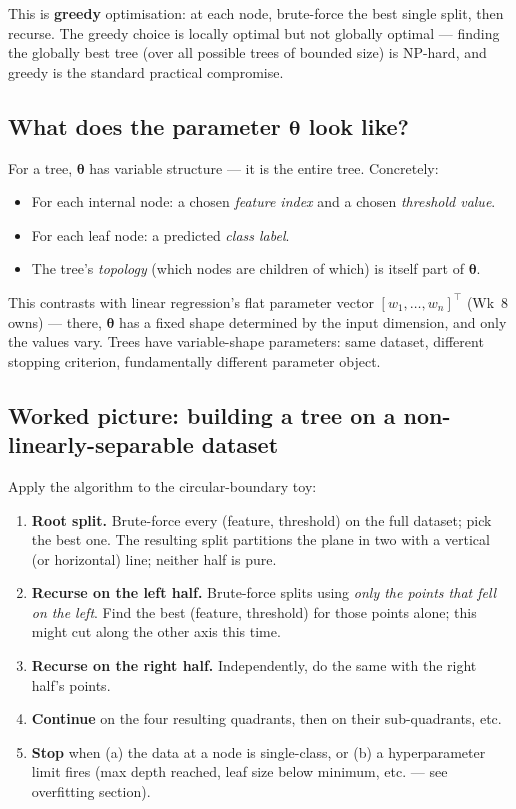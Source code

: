 \documentclass[11pt, a4paper]{article}
\begin{document}
This is \textbf{greedy} optimisation: at each node, brute-force the best single split, then recurse. The greedy choice is locally optimal but not globally optimal — finding the globally best tree (over all possible trees of bounded size) is NP-hard, and greedy is the standard practical compromise.

\subsection{\texorpdfstring{What does the parameter $\boldsymbol\theta$ look like?}{What does the parameter theta look like?}}

For a tree, $\boldsymbol\theta$ has variable structure — it is the entire tree. Concretely:

\begin{itemize}
  \item For each internal node: a chosen \emph{feature index} and a chosen \emph{threshold value}.
  \item For each leaf node: a predicted \emph{class label}.
  \item The tree's \emph{topology} (which nodes are children of which) is itself part of $\boldsymbol\theta$.
\end{itemize}

This contrasts with linear regression's flat parameter vector $[w_1, \ldots, w_n]^\top$ (Wk~8 owns) — there, $\boldsymbol\theta$ has a fixed shape determined by the input dimension, and only the values vary. Trees have variable-shape parameters: same dataset, different stopping criterion, fundamentally different parameter object.

\subsection{Worked picture: building a tree on a non-linearly-separable dataset}

Apply the algorithm to the circular-boundary toy:

\begin{enumerate}
  \item \textbf{Root split.} Brute-force every (feature, threshold) on the full dataset; pick the best one. The resulting split partitions the plane in two with a vertical (or horizontal) line; neither half is pure.
  \item \textbf{Recurse on the left half.} Brute-force splits using \emph{only the points that fell on the left}. Find the best (feature, threshold) for those points alone; this might cut along the other axis this time.
  \item \textbf{Recurse on the right half.} Independently, do the same with the right half's points.
  \item \textbf{Continue} on the four resulting quadrants, then on their sub-quadrants, etc.
  \item \textbf{Stop} when (a) the data at a node is single-class, or (b) a hyperparameter limit fires (max depth reached, leaf size below minimum, etc. — see overfitting section).
\end{enumerate}
\end{document}
